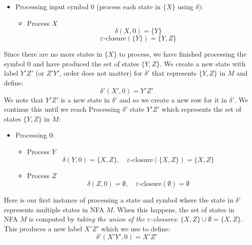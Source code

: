 \documentclass{report}
\begin{document}
\begin{itemize}
            \begin{itemize}
                \item Processing input symbol 0 (process each state in $\{X\}$ using $\delta$):
                    \begin{itemize}
                        \item Process $X$
                            \[
                                \delta(X, 0) = \{Y\}
                            \]
                            \[
                                \varepsilon\text{-closure}(\{Y\}) = \{Y, Z\}
                            \]
                    \end{itemize}
            \end{itemize}
    Since there are no more states in $\{X\}$ to process, we have finished processing the symbol 0 and have produced the set of states $\{Y, Z\}$.
    \bigbreak \noindent 
    We create a new state with label $Y'Z'$ (or $Z'Y'$, order does not matter) for $\delta'$ that represents $\{Y, Z\}$ in $M$ and define:
    \[
    \delta'(X', 0) = Y'Z'
    \]
    We note that $Y'Z'$ is a new state in $\delta'$ and so we create a new row for it in $\delta'$.
    \bigbreak \noindent 
    We continue this until we reach 
    \bigbreak \noindent 
    \bigbreak \noindent 
    Processing $\delta'$ state $Y'Z'$ which represents the set of states $\{Y, Z\}$ in $M$:
    \begin{itemize}
        \item Processing 0:
            \begin{itemize}
                \item Process $Y$
                    \[
                        \delta(Y, 0) = \{X, Z\}, \quad \varepsilon\text{-closure}(\{X, Z\}) = \{X, Z\}
                    \]
                \item Process $Z$
                    \[
                        \delta(Z, 0) = \emptyset, \quad \varepsilon\text{-closure}(\emptyset) = \emptyset
                    \]
            \end{itemize}
    \end{itemize}
    Here is our first instance of processing a state and symbol where the state in $\delta'$ represents multiple states in NFA $M$. When this happens, the set of states in NFA $M$ is computed by \textit{taking the union of the $\varepsilon$-closures}: $\{X, Z\} \cup \emptyset = \{X, Z\}$.
    \bigbreak \noindent 
    This produces a new label $X'Z'$ which we use to define:
    \[
        \delta'(X'Y', 0) = X'Z'
\]
\end{itemize}
\end{document}
